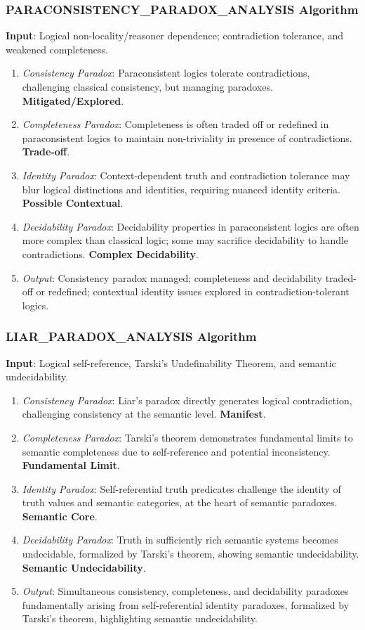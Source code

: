 	\subsubsection{PARACONSISTENCY\_PARADOX\_ANALYSIS Algorithm}
	\textbf{Input}: Logical non-locality/reasoner dependence; contradiction tolerance, and weakened completeness.
	\begin{enumerate}
		\item \textit{Consistency Paradox}: Paraconsistent logics tolerate contradictions, challenging classical consistency, but managing paradoxes. \textbf{Mitigated/Explored}.
		\item \textit{Completeness Paradox}: Completeness is often traded off or redefined in paraconsistent logics to maintain non-triviality in presence of contradictions. \textbf{Trade-off}.
		\item \textit{Identity Paradox}: Context-dependent truth and contradiction tolerance may blur logical distinctions and identities, requiring nuanced identity criteria. \textbf{Possible Contextual}.
		\item \textit{Decidability Paradox}: Decidability properties in paraconsistent logics are often more complex than classical logic; some may sacrifice decidability to handle contradictions. \textbf{Complex Decidability}.
		\item \textit{Output}: Consistency paradox managed; completeness and decidability traded-off or redefined; contextual identity issues explored in contradiction-tolerant logics.
	\end{enumerate}
	
	
	\subsubsection{LIAR\_PARADOX\_ANALYSIS Algorithm}
	\textbf{Input}: Logical self-reference, Tarski's Undefinability Theorem, and semantic undecidability.
	\begin{enumerate}
		\item \textit{Consistency Paradox}: Liar's paradox directly generates logical contradiction, challenging consistency at the semantic level. \textbf{Manifest}.
		\item \textit{Completeness Paradox}: Tarski's theorem demonstrates fundamental limits to semantic completeness due to self-reference and potential inconsistency. \textbf{Fundamental Limit}.
		\item \textit{Identity Paradox}: Self-referential truth predicates challenge the identity of truth values and semantic categories, at the heart of semantic paradoxes. \textbf{Semantic Core}.
		\item \textit{Decidability Paradox}: Truth in sufficiently rich semantic systems becomes undecidable, formalized by Tarski's theorem, showing semantic undecidability. \textbf{Semantic Undecidability}.
		\item \textit{Output}: Simultaneous consistency, completeness, and decidability paradoxes fundamentally arising from self-referential identity paradoxes, formalized by Tarski's theorem, highlighting semantic undecidability.
	\end{enumerate}
	
